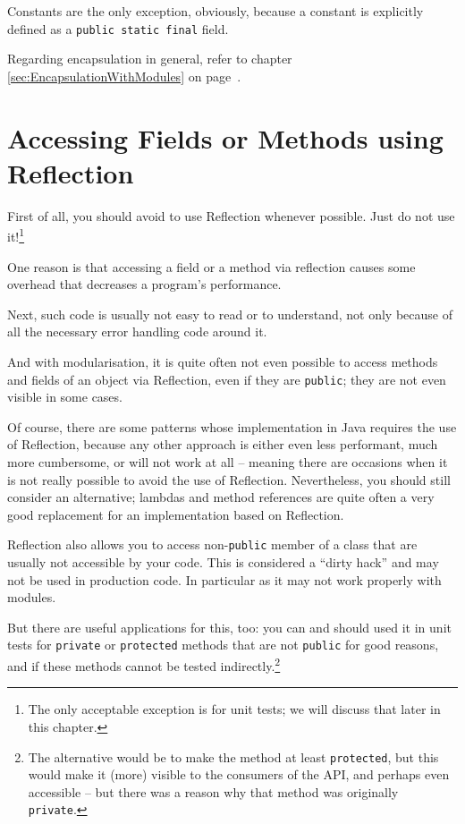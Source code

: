 \documentclass[11pt,a4paper, titlepage, parskip=half, headsepline, footsepline, cleardoublepage=current, headheight=1cm]{scrbook}
\newcommand*{\tqvref}[1]{\hyperref[{#1}]{\ref*{#1}} on page~\pageref{#1}}
\begin{document}
Constants are the only exception, obviously, because a constant is explicitly defined as a \lstinline|public static final| field.

Regarding encapsulation in general, refer to chapter \tqvref{sec:EncapsulationWithModules}.

\section{Accessing Fields or Methods using Reflection}\label{sec:Reflection}
First of all, you should avoid to use Reflection whenever possible. Just do not use it!\footnote{The only acceptable exception is for unit tests; we will discuss that later in this chapter.}

One reason is that accessing a field or a method via reflection causes some overhead that decreases a program’s performance. 

Next, such code is usually not easy to read or to understand, not only because of all the necessary error handling code around it.

And with modularisation, it is quite often not even possible to access methods and fields of an object via Reflection, even if they are \lstinline|public|; they are not even visible in some cases.

Of course, there are some patterns whose implementation in Java requires the use of Reflection, because any other approach is either even less performant, much more cumbersome, or will not work at all – meaning there are occasions when it is not really possible to avoid the use of Reflection. Nevertheless, you should still consider an alternative; lambdas\autocite{ORACLE_DOC_LANGUAGE_SPECIFICATION:LambdaExpressions} and method references\autocite{ORACLE_DOC_LANGUAGE_SPECIFICATION:MethodReference} are quite often a very good replacement for an implementation based on Reflection.

Reflection also allows you to access non-\lstinline|public| member of a class that are usually not accessible by your code. This is considered a “dirty hack” and may not be used in production code. In particular as it may not work properly with modules.

But there are useful applications for this, too: you can and should used it in unit tests for \lstinline|private| or \lstinline|protected| methods that are not \lstinline|public| for good reasons, and if these methods cannot be tested indirectly.\footnote{The alternative would be to make the method at least \lstinline|protected|, but this would make it (more) visible to the consumers of the API, and perhaps even accessible – but there was a reason why that method was originally \lstinline|private|.}
\end{document}
